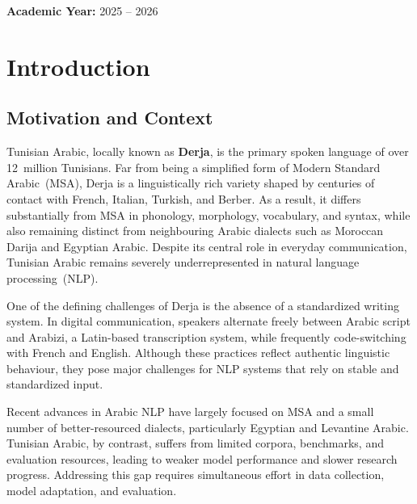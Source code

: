 \documentclass[12pt,a4paper]{report}
\newcommand{\academicyear}{2025 -- 2026}
\begin{document}
\vspace{1cm}

\begin{center}

\vspace{0.25cm}
\textbf{Academic Year:} \academicyear
\end{center}

\tableofcontents
\listoffigures
\listoftables

\newpage
\newpage



\chapter{Introduction}
\label{chap:introduction}

\section{Motivation and Context}

Tunisian Arabic, locally known as \textbf{Derja}, is the primary spoken language of over
12~million Tunisians. Far from being a simplified form of Modern Standard Arabic~(MSA),
Derja is a linguistically rich variety shaped by centuries of contact with French, Italian,
Turkish, and Berber. As a result, it differs substantially from MSA in phonology,
morphology, vocabulary, and syntax, while also remaining distinct from neighbouring Arabic
dialects such as Moroccan Darija and Egyptian Arabic. Despite its central role in everyday
communication, Tunisian Arabic remains severely underrepresented in natural language
processing~(NLP).

One of the defining challenges of Derja is the absence of a standardized writing system.
In digital communication, speakers alternate freely between Arabic script and Arabizi, a
Latin-based transcription system, while frequently code-switching with French and English.
Although these practices reflect authentic linguistic behaviour, they pose major challenges
for NLP systems that rely on stable and standardized input.

Recent advances in Arabic NLP have largely focused on MSA and a small number of
better-resourced dialects, particularly Egyptian and Levantine Arabic. Tunisian Arabic,
by contrast, suffers from limited corpora, benchmarks, and evaluation resources, leading
to weaker model performance and slower research progress. Addressing this gap requires
simultaneous effort in data collection, model adaptation, and evaluation.
\end{document}
